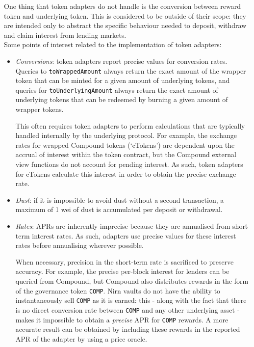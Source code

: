 \documentclass{article}
\begin{document}
\noindent
One thing that token adapters do not handle is the conversion between reward token and underlying token. This is considered to be outside of their scope: they are intended only to abstract the specific behaviour needed to deposit, withdraw and claim interest from lending markets.\\

\noindent
Some points of interest related to the implementation of token adapters:

\begin{itemize}
    \item \textit{Conversions}: token adapters report precise values for conversion rates. Queries to \texttt{toWrappedAmount} always return the exact amount of the wrapper token that can be minted for a given amount of underlying tokens, and queries for \texttt{toUnderlyingAmount} always return the exact amount of underlying tokens that can be redeemed by burning a given amount of wrapper tokens.

This often requires token adapters to perform calculations that are typically handled internally by the underlying protocol. For example, the exchange rates for wrapped Compound tokens (`cTokens') are dependent upon the accrual of interest within the token contract, but the Compound external view functions do not account for pending interest. As such, token adapters for cTokens calculate this interest in order to obtain the precise exchange rate.

    \item \textit{Dust}: if it is impossible to avoid dust without a second transaction, a maximum of 1 wei of dust is accumulated per deposit or withdrawal.
    
    \item \textit{Rates}: APRs are inherently imprecise because they are annualised from short-term interest rates. As such, adapters use precise values for these interest rates before annualising wherever possible.
    
    When necessary, precision in the short-term rate is sacrificed to preserve accuracy. For example, the precise per-block interest for lenders can be queried from Compound, but Compound also distributes rewards in the form of the governance token \texttt{COMP}. Nirn vaults do not have the ability to instantaneously sell \texttt{COMP} as it is earned: this - along with the fact that there is no direct conversion rate between \texttt{COMP} and any other underlying asset - makes it impossible to obtain a \textit{precise} APR for \texttt{COMP} rewards. A more accurate result can be obtained by including these rewards in the reported APR of the adapter by using a price oracle.
\end{itemize}
\end{document}
